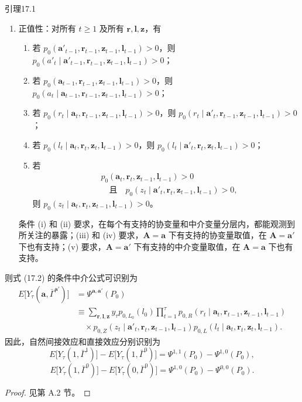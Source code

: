 \begin{bookresult}{引理}{17.1}
\begin{enumerate}[label=A\arabic*.,leftmargin=2.8em]
 \item 正值性：对所有 $t\geq1$ 及所有 $\mathbf r,\mathbf l,\mathbf z$，有
 \begin{enumerate}[label=(\roman*),leftmargin=2.8em]
  \item 若 $p_0(\mathbf a'_{t-1},\mathbf r_{t-1},\mathbf z_{t-1},\mathbf l_{t-1})>0$，则 $p_0(a'_t\mid\mathbf a'_{t-1},\mathbf r_{t-1},\mathbf z_{t-1},\mathbf l_{t-1})>0$；
  \item 若 $p_0(\mathbf a_{t-1},\mathbf r_{t-1},\mathbf z_{t-1},\mathbf l_{t-1})>0$，则 $p_0(a_t\mid\mathbf a_{t-1},\mathbf r_{t-1},\mathbf z_{t-1},\mathbf l_{t-1})>0$；
  \item 若 $p_0(r_t\mid\mathbf a_t,\mathbf r_{t-1},\mathbf z_{t-1},\mathbf l_{t-1})>0$，则 $p_0(r_t\mid\mathbf a'_t,\mathbf r_{t-1},\mathbf z_{t-1},\mathbf l_{t-1})>0$；
  \item 若 $p_0(l_t\mid\mathbf a_t,\mathbf r_t,\mathbf z_t,\mathbf l_{t-1})>0$，则 $p_0(l_t\mid\mathbf a'_t,\mathbf r_t,\mathbf z_t,\mathbf l_{t-1})>0$；
  \item 若
  \[
  \begin{aligned}
   &p_0(\mathbf a_t,\mathbf r_t,\mathbf z_{t-1},\mathbf l_{t-1})>0\\
   &\quad\text{且}\quad
   p_0(z_t\mid\mathbf a'_t,\mathbf r_t,\mathbf z_{t-1},\mathbf l_{t-1})>0,
  \end{aligned}
  \]
  则 $p_0(z_t\mid\mathbf a_t,\mathbf r_t,\mathbf z_{t-1},\mathbf l_{t-1})>0$。
 \end{enumerate}
 条件 (i) 和 (ii) 要求，在每个有支持的协变量和中介变量分层内，都能观测到所关注的暴露；(iii) 和 (iv) 要求，$\mathbf A=\mathbf a$ 下有支持的协变量取值，在 $\mathbf A=\mathbf a'$ 下也有支持；(v) 要求，$\mathbf A=\mathbf a'$ 下有支持的中介变量取值，在 $\mathbf A=\mathbf a$ 下也有支持。
\end{enumerate}
则式 (17.2) 的条件中介公式可识别为
\[
\begin{aligned}
 E\bigl[Y_\tau(\mathbf a,\bar\Gamma^{\mathbf a'})\bigr]
 &=\Psi^{\mathbf a,\mathbf a'}(P_0)\\
 &\equiv\sum_{\mathbf r,\mathbf l,\mathbf z}y_\tau p_{0,L_0}(l_0)
 \prod_{t=1}^\tau p_{0,R}(r_t\mid\mathbf a_t,\mathbf r_{t-1},\mathbf z_{t-1},\mathbf l_{t-1})\\
 &\quad{}\times p_{0,Z}(z_t\mid\mathbf a'_t,\mathbf r_t,\mathbf z_{t-1},\mathbf l_{t-1})
 p_{0,L}(l_t\mid\mathbf a_t,\mathbf r_t,\mathbf z_t,\mathbf l_{t-1}).
\end{aligned}
\]
因此，自然间接效应和直接效应分别识别为
\begin{equation}
 E\bigl[Y_\tau(1,\bar\Gamma^1)\bigr]-E\bigl[Y_\tau(1,\bar\Gamma^0)\bigr]
 =\Psi^{1,1}(P_0)-\Psi^{1,0}(P_0),
 \tag{17.5}
\end{equation}
\begin{equation}
 E\bigl[Y_\tau(1,\bar\Gamma^0)\bigr]-E\bigl[Y_\tau(0,\bar\Gamma^0)\bigr]
 =\Psi^{1,0}(P_0)-\Psi^{0,0}(P_0).
 \tag{17.6}
\end{equation}
\end{bookresult}
\begin{proof}
见第 A.2 节。
\end{proof}

